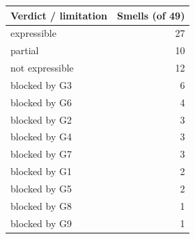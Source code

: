 \begin{tabular}{lr}
\toprule
Verdict / limitation & Smells (of 49) \\
\midrule
expressible & 27 \\
partial & 10 \\
not expressible & 12 \\
\midrule
blocked by G3 & 6 \\
blocked by G6 & 4 \\
blocked by G2 & 3 \\
blocked by G4 & 3 \\
blocked by G7 & 3 \\
blocked by G1 & 2 \\
blocked by G5 & 2 \\
blocked by G8 & 1 \\
blocked by G9 & 1 \\
\bottomrule
\end{tabular}
